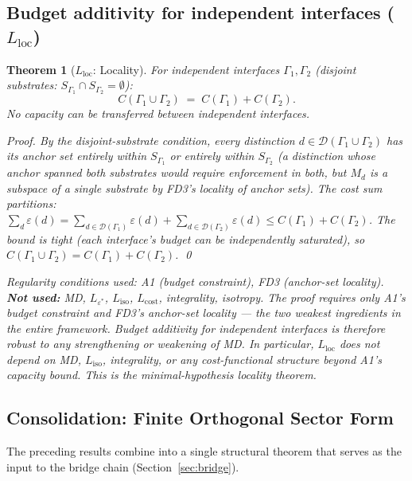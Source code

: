\documentclass[11pt,a4paper]{article}
\newtheorem{theorem}{Theorem}[section]
\theoremstyle{definition}
\newcommand{\eps}{\varepsilon}
\begin{document}
\subsection{Budget additivity for independent interfaces ($L_{\mathrm{loc}}$)}

\begin{theorem}[$L_{\mathrm{loc}}$: Locality]\label{thm:Lloc}
For independent interfaces $\Gamma_1, \Gamma_2$ (disjoint substrates: $S_{\Gamma_1} \cap S_{\Gamma_2} = \emptyset$):
\[
C(\Gamma_1 \cup \Gamma_2) \;=\; C(\Gamma_1) + C(\Gamma_2).
\]
No capacity can be transferred between independent interfaces.

\noindent\textit{Proof.}  By the disjoint-substrate condition, every distinction $d \in \mathcal{D}(\Gamma_1 \cup \Gamma_2)$ has its anchor set entirely within $S_{\Gamma_1}$ or entirely within $S_{\Gamma_2}$ (a distinction whose anchor spanned both substrates would require enforcement in both, but $M_d$ is a subspace of a single substrate by FD3's locality of anchor sets).  The cost sum partitions: $\sum_d \eps(d) = \sum_{d \in \mathcal{D}(\Gamma_1)} \eps(d) + \sum_{d \in \mathcal{D}(\Gamma_2)} \eps(d) \le C(\Gamma_1) + C(\Gamma_2)$.  The bound is tight (each interface's budget can be independently saturated), so $C(\Gamma_1 \cup \Gamma_2) = C(\Gamma_1) + C(\Gamma_2)$.  \qed

\noindent\textit{Regularity conditions used:} A1 (budget constraint), FD3 (anchor-set locality).  \textbf{Not used:} MD, $L_{\eps^*}$, $L_{\mathrm{iso}}$, $L_{\mathrm{cost}}$, integrality, isotropy.  The proof requires only A1's budget constraint and FD3's anchor-set locality --- the two weakest ingredients in the entire framework.  Budget additivity for independent interfaces is therefore robust to any strengthening or weakening of MD.  In particular, $L_{\mathrm{loc}}$ does not depend on MD, $L_{\mathrm{iso}}$, integrality, or any cost-functional structure beyond A1's capacity bound.  This is the minimal-hypothesis locality theorem.
\end{theorem}

\subsection{Consolidation: Finite Orthogonal Sector Form}

The preceding results combine into a single structural theorem that serves as the input to the bridge chain (Section~\ref{sec:bridge}).
\end{document}
